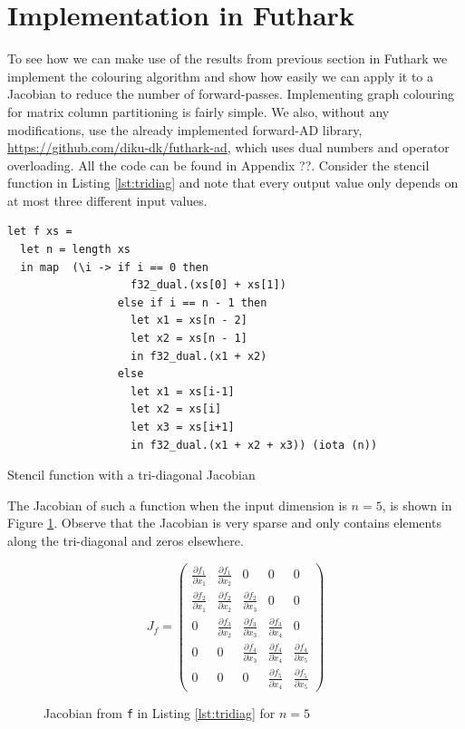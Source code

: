 	\section{Implementation in Futhark}
	To see how we can make use of the results from previous section
	in Futhark we implement the colouring algorithm and show how easily
	we can apply it to a Jacobian to reduce the number of forward-passes.
	Implementing graph colouring for matrix column partitioning is fairly simple. We
	also, without any modifications, use the already implemented forward-AD library,
	\url{https://github.com/diku-dk/futhark-ad}, which uses dual numbers and operator overloading. All the code can be found in
	Appendix ??.
	Consider the stencil function in Listing \ref{lst:tridiag} and note that every
	output value only depends on at most three different input values.
\begin{listing}[H]
\begin{verbatim}
let f xs =
  let n = length xs
  in map  (\i -> if i == 0 then
                   f32_dual.(xs[0] + xs[1])
                 else if i == n - 1 then
                   let x1 = xs[n - 2]
                   let x2 = xs[n - 1]
                   in f32_dual.(x1 + x2)
                 else
                   let x1 = xs[i-1]
                   let x2 = xs[i]
                   let x3 = xs[i+1]
                   in f32_dual.(x1 + x2 + x3)) (iota (n))
\end{verbatim}
\caption{Stencil function with a tri-diagonal Jacobian}
\label{lst:tridiag}
\end{listing}
	The Jacobian of such a function when the input dimension is $n= 5$, is shown in
	Figure \ref{fig:tridiag}. Observe that
	the Jacobian is very sparse and only
	contains elements along the
	tri-diagonal and zeros elsewhere.
	\begin{figure}[H]
		$$ J_{f} = \left(\begin{matrix}
		\frac{\partial f_1}{\partial x_1} & \frac{\partial f_1}{\partial x_2} & 0 & 0 &
		0 \\
		\frac{\partial f_2}{\partial x_1}& \frac{\partial f_2}{\partial x_2} &
		\frac{\partial f_2}{\partial x_3} & 0 & 0\\
		0 & \frac{\partial f_3}{\partial x_2} & \frac{\partial f_3}{\partial x_3} &
		\frac{\partial f_3}{\partial x_4} & 0\\
		0 & 0 & \frac{\partial f_4}{\partial x_3} & \frac{\partial f_4}{\partial x_4} &
		\frac{\partial f_4}{\partial x_5} \\
		0 & 0 & 0 & \frac{\partial f_5}{\partial x_4} & \frac{\partial f_5}{\partial
			x_5}
		\end{matrix}\right) $$
		\caption{Jacobian from \texttt{f} in Listing \ref{lst:tridiag} for $n=5$}
		\label{fig:tridiag}
	\end{figure}
